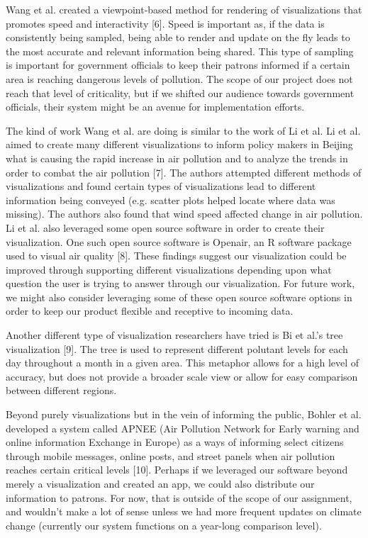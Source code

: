 \documentclass[journal]{vgtc}                %
\begin{document}
Wang et al. created a viewpoint-based method for rendering of visualizations that promotes speed and interactivity [6]. 
Speed is important as, if the data is consistently being sampled, being able to render and update on the 
fly leads to the most accurate and relevant information being shared. This type of sampling is important for government
officials to keep their patrons informed if a certain area is reaching dangerous levels of pollution. The scope of our
project does not reach that level of criticality, but if we shifted our audience towards government officials, their
system might be an avenue for implementation efforts.

The kind of work Wang et al. are doing is similar to the work of Li et al. Li et al. aimed to create many different
visualizations to inform policy makers in Beijing what is causing the rapid increase in air pollution and to analyze
the trends in order to combat the air pollution [7]. The authors attempted different methods of 
visualizations and found certain types of visualizations lead to different information being conveyed (e.g. scatter
plots helped locate where data was missing). The authors also found that wind speed affected change in air pollution.
Li et al. also leveraged some open source software in order to create their visualization. One such open source software is
Openair, an R software package used to visual air quality [8].
These findings suggest our visualization could be improved through supporting different visualizations depending
upon what question the user is trying to answer through our visualization. For future work, we might also consider
leveraging some of these open source software options in order to keep our product flexible and receptive to incoming
data.

Another different type of visualization researchers have tried is Bi et al.'s tree visualization [9]. The tree is
used to represent different polutant levels for each day throughout a month in a given area. This metaphor allows for
a high level of accuracy, but does not provide a broader scale view or allow for easy comparison between different regions.

Beyond purely visualizations but in the vein of informing the public, 
Bohler et al. developed a system called APNEE (Air Pollution Network for Early warning and online information Exchange in
 Europe) as a ways of informing select citizens through mobile messages, online posts, and street panels when air pollution
 reaches certain critical levels [10]. 
 Perhaps if we leveraged our software beyond merely a visualization and created an app, we
 could also distribute our information to patrons. For now, that is outside of the scope of our assignment, and wouldn't
 make a lot of sense unless we had more frequent updates on climate change (currently our system functions on a year-long
 comparison level).
\end{document}
